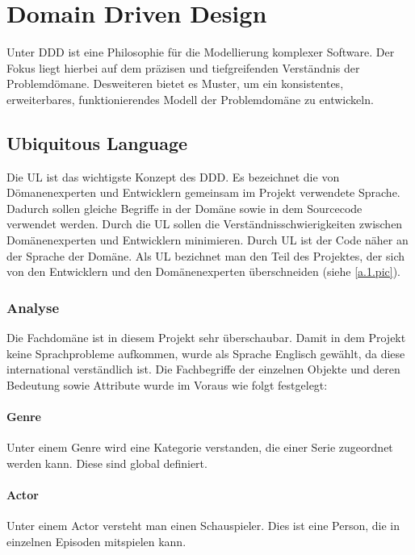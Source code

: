 
\chapter{Domain Driven Design}
Unter \ac{DDD} ist eine Philosophie für die Modellierung komplexer Software. Der Fokus liegt hierbei auf dem präzisen und tiefgreifenden Verständnis der Problemdömane. Desweiteren bietet es Muster, um ein konsistentes, erweiterbares, funktionierendes Modell der Problemdomäne zu entwickeln.

\section{Ubiquitous Language}
Die \ac{UL} ist das wichtigste Konzept des \ac{DDD}. Es bezeichnet die von Dömanenexperten und Entwicklern gemeinsam im Projekt verwendete Sprache. Dadurch sollen gleiche Begriffe in der Domäne sowie in dem Sourcecode verwendet werden. Durch die \ac{UL} sollen die Verständnisschwierigkeiten zwischen Domänenexperten und Entwicklern minimieren. Durch \ac{UL} ist der Code näher an der Sprache der Domäne. Als \ac{UL} bezichnet man den Teil des Projektes, der sich von den Entwicklern und den Domänenexperten überschneiden (siehe \cref{a.1.pic}).

\subsection{Analyse}
Die Fachdomäne ist in diesem Projekt sehr überschaubar. Damit in dem Projekt keine Sprachprobleme aufkommen, wurde als Sprache Englisch gewählt, da diese international verständlich ist. Die Fachbegriffe der einzelnen Objekte und deren Bedeutung sowie Attribute wurde im Voraus wie folgt festgelegt:

\subsubsection{Genre}
Unter einem Genre wird eine Kategorie verstanden, die einer Serie zugeordnet werden kann. Diese sind global definiert.
\subsubsection{Actor}
Unter einem Actor versteht man einen Schauspieler. Dies ist eine Person, die in einzelnen Episoden mitspielen kann.
